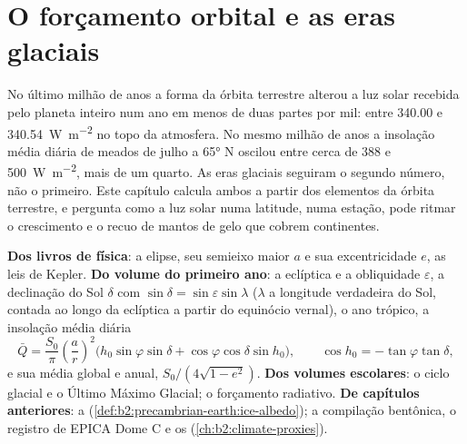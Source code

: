 \chapter{O forçamento orbital e as eras glaciais}\label{ch:b2:orbital-forcing}

No último milhão de anos a forma da órbita terrestre alterou a luz solar recebida pelo
planeta inteiro num ano em menos de duas partes por mil: entre \num{340.00} e
\qty{340.54}{W.m^{-2}} no topo da atmosfera. No mesmo milhão de anos a insolação média diária
de meados de julho a \ang{65} N oscilou entre cerca de 388 e \qty{500}{W.m^{-2}}, mais de
um quarto. As eras glaciais seguiram o segundo número, não o primeiro. Este capítulo calcula ambos
a partir dos elementos da órbita terrestre, e pergunta como a luz solar numa latitude, numa estação, pode
ritmar o crescimento e o recuo de mantos de gelo que cobrem continentes.

\begin{recall}
\textbf{Dos livros de física}: a elipse, seu semieixo maior $a$ e sua excentricidade $e$, as leis de
Kepler. \textbf{Do volume do primeiro ano}: a eclíptica e a obliquidade $\varepsilon$, a declinação
do Sol $\delta$ com $\sin\delta = \sin\varepsilon\sin\lambda$ ($\lambda$ a longitude verdadeira do Sol,
contada ao longo da eclíptica a partir do equinócio vernal), o ano trópico, a insolação média
diária
\[
  \bar Q = \frac{S_0}{\pi}\left(\frac{a}{r}\right)^{2}\bigl(h_0\sin\varphi\sin\delta +
  \cos\varphi\cos\delta\sin h_0\bigr),\qquad \cos h_0 = -\tan\varphi\tan\delta ,
\]
e sua média global e anual, $S_0/(4\sqrt{1 - e^2})$. \textbf{Dos volumes escolares}: o
ciclo glacial e o Último Máximo Glacial; o forçamento radiativo. \textbf{De capítulos anteriores}: a
 (\cref{def:b2:precambrian-earth:ice-albedo}); a compilação bentônica, o registro de EPICA
Dome C e os  (\cref{ch:b2:climate-proxies}).
\end{recall}

